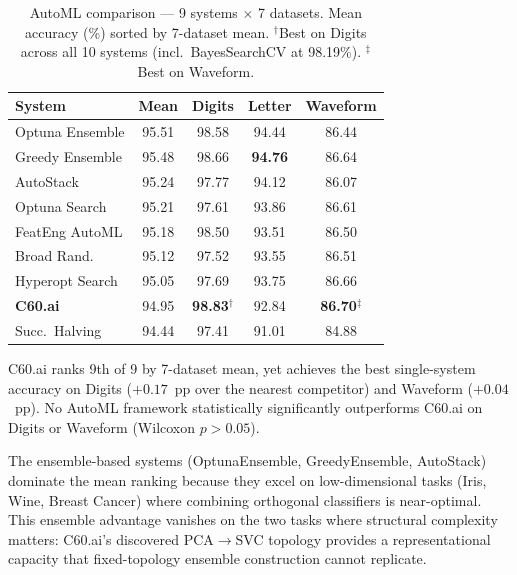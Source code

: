 \documentclass{article}
\theoremstyle{definition}
\theoremstyle{plain}
\theoremstyle{remark}
\newcommand{\sys}[1]{\textbf{\textcolor{c60blue}{#1}}}
\begin{document}
\begin{table}[t]
  \caption{%
    AutoML comparison — 9 systems $\times$ 7 datasets.
    Mean accuracy (\%) sorted by 7-dataset mean.
    $^\dagger$Best on Digits across all 10 systems (incl.\ BayesSearchCV
    at 98.19\%).
    $^\ddagger$Best on Waveform.%
  }
  \label{tab:automl}
  \vskip 0.05in
  \begin{center}
    \begin{small}
      \begin{tabular}{lcccc}
        \toprule
        System             & Mean   & Digits              & Letter         & Waveform \\
        \midrule
        Optuna Ensemble    & 95.51  & 98.58               & 94.44          & 86.44 \\
        Greedy Ensemble    & 95.48  & 98.66               & \textbf{94.76} & 86.64 \\
        AutoStack          & 95.24  & 97.77               & 94.12          & 86.07 \\
        Optuna Search      & 95.21  & 97.61               & 93.86          & 86.61 \\
        FeatEng AutoML     & 95.18  & 98.50               & 93.51          & 86.50 \\
        Broad Rand.        & 95.12  & 97.52               & 93.55          & 86.51 \\
        Hyperopt Search    & 95.05  & 97.69               & 93.75          & 86.66 \\
        \sys{C60.ai}       & 94.95  & \sys{98.83}$^\dagger$ & 92.84       & \sys{86.70}$^\ddagger$ \\
        Succ.\ Halving     & 94.44  & 97.41               & 91.01          & 84.88 \\
        \bottomrule
      \end{tabular}
    \end{small}
  \end{center}
  \vskip -0.1in
\end{table}

C60.ai ranks 9th of 9 by 7-dataset mean, yet achieves the best single-system
accuracy on Digits ($+0.17$~pp over the nearest competitor) and Waveform
($+0.04$~pp).
No AutoML framework statistically significantly outperforms C60.ai on
Digits or Waveform (Wilcoxon $p > 0.05$).

The ensemble-based systems (OptunaEnsemble, GreedyEnsemble, AutoStack)
dominate the mean ranking because they excel on low-dimensional tasks
(Iris, Wine, Breast Cancer) where combining orthogonal classifiers is
near-optimal.
This ensemble advantage vanishes on the two tasks where structural complexity
matters: C60.ai's discovered PCA$\to$SVC topology provides a
representational capacity that fixed-topology ensemble construction cannot
replicate.
\end{document}
